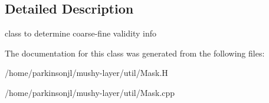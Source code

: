 \subsection{Detailed Description}
class to determine coarse-\/fine validity info 

The documentation for this class was generated from the following files\-:\begin{DoxyCompactItemize}
\item 
/home/parkinsonjl/mushy-\/layer/util/Mask.\-H\item 
/home/parkinsonjl/mushy-\/layer/util/Mask.\-cpp\end{DoxyCompactItemize}
